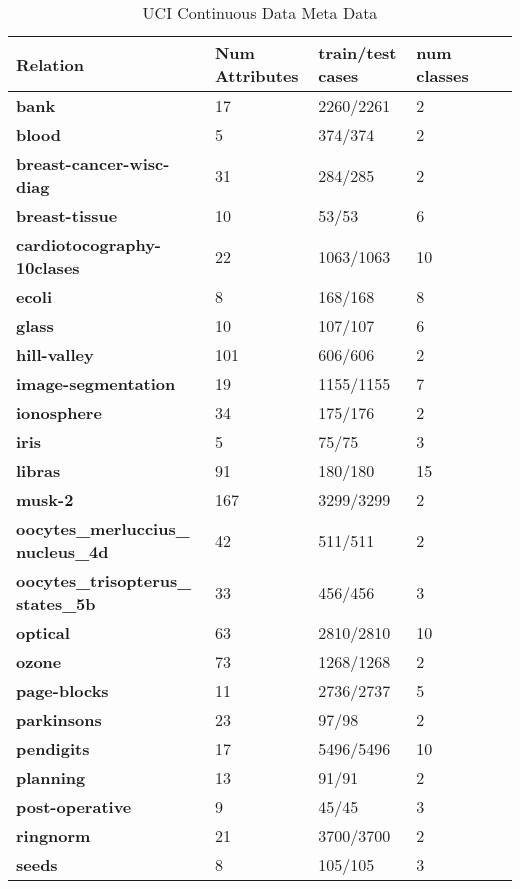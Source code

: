 \documentclass{cmppgr}
\begin{document}
\begin{table}[th]
  \centering
  \scriptsize
  \caption{UCI Continuous Data Meta Data}
  \begin{tabular}{|p{2cm}|p{1.4cm}|p{1.4cm}| p{1.4cm} |p{1cm}| p{1cm}|}
  \hline \bf Relation & \bf Num Attributes & \bf train/test cases & \bf num classes \\ [10pt]

  \hline \bf bank & 17 & 2260/2261 & 2 \\ [7pt]
  \hline \bf blood & 5 & 374/374 & 2 \\ [7pt]
  \hline \bf breast-cancer-wisc-diag & 31 & 284/285 & 2 \\ [7pt]
  \hline \bf breast-tissue & 10 & 53/53 & 6 \\ [7pt]
  \hline \bf cardiotocography-10clases & 22 & 1063/1063 & 10 \\ [7pt]
  \hline \bf ecoli & 8 & 168/168 & 8 \\ [7pt]
  \hline \bf glass & 10 & 107/107 & 6 \\ [7pt]
  \hline \bf hill-valley & 101 & 606/606 & 2 \\ [7pt]
  \hline \bf image-segmentation & 19 & 1155/1155 & 7 \\ [7pt]
  \hline \bf ionosphere & 34 & 175/176 & 2 \\ [7pt]
  \hline \bf iris & 5 & 75/75 & 3 \\ [7pt]
  \hline \bf libras & 91 & 180/180 & 15 \\ [7pt]
  \hline \bf musk-2 & 167 & 3299/3299 & 2 \\ [7pt]
  \hline \bf oocytes\_merluccius\_ nucleus\_4d & 42 & 511/511 & 2 \\ [7pt]
  \hline \bf oocytes\_trisopterus\_ states\_5b & 33 & 456/456 & 3 \\ [7pt]
  \hline \bf optical & 63 & 2810/2810 & 10 \\ [7pt]
  \hline \bf ozone & 73 & 1268/1268 & 2 \\ [7pt]
  \hline \bf page-blocks & 11 & 2736/2737 & 5 \\ [7pt]
  \hline \bf parkinsons & 23 & 97/98 & 2 \\ [7pt]
  \hline \bf pendigits & 17 & 5496/5496 & 10 \\ [7pt]
  \hline \bf planning & 13 & 91/91 & 2 \\ [7pt]
  \hline \bf post-operative & 9 & 45/45 & 3 \\ [7pt]
  \hline \bf ringnorm & 21 & 3700/3700 & 2 \\ [7pt]
  \hline \bf seeds & 8 & 105/105 & 3 \\ [7pt]

\end{tabular}
\end{table}
\end{document}
